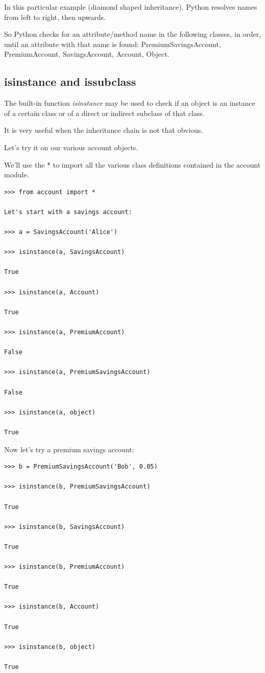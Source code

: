 \documentclass{article}
\begin{document}
In this particular example (diamond shaped inheritance), Python resolves names from left to right, then upwards. 

So Python checks for an attribute/method name in the following classes, in order, until an attribute with that name is found:  PremiumSavingsAccount, PremiumAccount, SavingsAccount, Account, Object.

\subsection{isinstance and issubclass}

The built-in function \textit{isinstance} may be used to check if an object is an instance of a certain class or of a direct or indirect subclass of that class.

It is very useful when the inheritance chain is not that obvious.

Let's try it on our various account objects.

We'll use the * to import all the various class definitions contained in the account module.

\begin{lstlisting}
>>> from account import *

Let's start with a savings account:

>>> a = SavingsAccount('Alice')

>>> isinstance(a, SavingsAccount)

True

>>> isinstance(a, Account)

True

>>> isinstance(a, PremiumAccount)

False

>>> isinstance(a, PremiumSavingsAccount)

False

>>> isinstance(a, object)

True
\end{lstlisting}

Now let's try a premium savings account:

\begin{lstlisting}
>>> b = PremiumSavingsAccount('Bob', 0.05)

>>> isinstance(b, PremiumSavingsAccount)

True

>>> isinstance(b, SavingsAccount)

True

>>> isinstance(b, PremiumAccount)

True

>>> isinstance(b, Account)

True

>>> isinstance(b, object)

True
\end{lstlisting}
\end{document}
